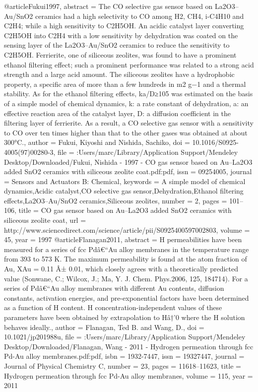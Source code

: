 @article{Fukui1997,
abstract = {The CO selective gas sensor based on La2O3–Au/SnO2 ceramics had a high selectivity to CO among H2, CH4, i-C4H10 and C2H4; while a high sensitivity to C2H5OH. An acidic catalyst layer converting C2H5OH into C2H4 with a low sensitivity by dehydration was coated on the sensing layer of the La2O3–Au/SnO2 ceramics to reduce the sensitivity to C2H5OH. Ferrierite, one of siliceous zeolites, was found to have a prominent ethanol filtering effect; such a prominent performance was related to a strong acid strength and a large acid amount. The siliceous zeolites have a hydrophobic property, a specific area of more than a few hundreds in m2 g−1 and a thermal stability. As for the ethanol filtering effects, ka/D≥105 was estimated on the basis of a simple model of chemical dynamics, k: a rate constant of dehydration, a: an effective reaction area of the catalyst layer, D: a diffusion coefficient in the filtering layer of ferrierite. As a result, a CO selective gas sensor with a sensitivity to CO over ten times higher than that to the other gases was obtained at about 300°C.},
author = {Fukui, Kiyoshi and Nishida, Sachiko},
doi = {10.1016/S0925-4005(97)00280-3},
file = {:Users/marc/Library/Application Support/Mendeley Desktop/Downloaded/Fukui, Nishida - 1997 - CO gas sensor based on Au–La2O3 added SnO2 ceramics with siliceous zeolite coat.pdf:pdf},
issn = {09254005},
journal = {Sensors and Actuators B: Chemical},
keywords = {A simple model of chemical dynamics,Acidic catalyst,CO selective gas sensor,Dehydration,Ethanol filtering effects,La2O3–Au/SnO2 ceramics,Siliceous zeolites},
number = {2},
pages = {101--106},
title = {{CO gas sensor based on Au–La2O3 added SnO2 ceramics with siliceous zeolite coat}},
url = {http://www.sciencedirect.com/science/article/pii/S0925400597002803},
volume = {45},
year = {1997}
}
@article{Flanagan2011,
abstract = {H permeabilities have been measured for a series of fcc Pd{\^{a}}€“Au alloy membranes in the temperature range from 393 to 573 K. The maximum permeability is found at the atom fraction of Au, XAu = 0.11 {\^{A}}± 0.01, which closely agrees with a theoretically predicted value (Sonwane, C.; Wilcox, J.; Ma, Y. J. Chem. Phys.2006, 125, 184714). For a series of Pd{\^{a}}€“Au alloy membranes with different Au contents, diffusion constants, activation energies, and pre-exponential factors have been determined as a function of H content. H concentration-independent values of these parameters have been obtained by extrapolation to H{\^{a}}†'0 where the H solution behaves ideally.},
author = {Flanagan, Ted B. and Wang, D.},
doi = {10.1021/jp201988u},
file = {:Users/marc/Library/Application Support/Mendeley Desktop/Downloaded/Flanagan, Wang - 2011 - Hydrogen permeation through fcc Pd-Au alloy membranes.pdf:pdf},
isbn = {1932-7447},
issn = {19327447},
journal = {Journal of Physical Chemistry C},
number = {23},
pages = {11618--11623},
title = {{Hydrogen permeation through fcc Pd-Au alloy membranes}},
volume = {115},
year = {2011}
}
